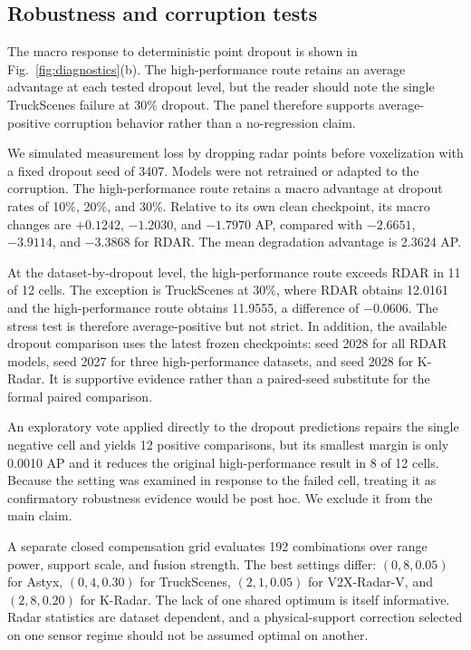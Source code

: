 \documentclass[preprint,12pt,times]{elsarticle}
\newcommand{\figref}[1]{\textcolor{floatreviewblue}{Fig.~\ref{#1}}}
\newcommand{\figref}[1]{Fig.~\ref{#1}}
\begin{document}
\subsection{Robustness and corruption tests}

The macro response to deterministic point dropout is shown in
\figref{fig:diagnostics}(b). The high-performance route retains an average
advantage at each tested dropout level, but the reader should note the single
TruckScenes failure at 30\% dropout. The panel therefore supports
average-positive corruption behavior rather than a no-regression claim.

We simulated measurement loss by dropping radar points before voxelization
with a fixed dropout seed of 3407. Models were not retrained or adapted to the
corruption. The high-performance route retains a macro advantage at dropout
rates of 10\%, 20\%, and 30\%. Relative
to its own clean checkpoint, its macro changes are $+0.1242$, $-1.2030$, and
$-1.7970$ AP, compared with $-2.6651$, $-3.9114$, and $-3.3868$ for RDAR.
The mean degradation advantage is 2.3624 AP.

At the dataset-by-dropout level, the high-performance route exceeds RDAR in 11
of 12 cells. The exception is TruckScenes at 30\%, where RDAR obtains 12.0161
and the high-performance route obtains 11.9555, a difference of $-0.0606$.
The stress test is therefore average-positive but not strict. In addition, the
available dropout comparison uses the latest frozen checkpoints: seed 2028 for
all RDAR models, seed 2027 for three high-performance datasets, and seed 2028
for K-Radar. It is supportive evidence rather than a paired-seed substitute
for the formal paired comparison.

An exploratory vote applied directly to the dropout predictions repairs the
single negative cell and yields 12 positive comparisons, but its smallest
margin is only 0.0010 AP and it reduces the original high-performance result
in 8 of 12 cells. Because the setting was examined in response to the failed
cell, treating it as confirmatory robustness evidence would be post hoc. We
exclude it from the main claim.

A separate closed compensation grid evaluates 192 combinations over range
power, support scale, and fusion strength. The best settings differ:
$(0,8,0.05)$ for Astyx, $(0,4,0.30)$ for TruckScenes,
$(2,1,0.05)$ for V2X-Radar-V, and $(2,8,0.20)$ for K-Radar. The lack of one
shared optimum is itself informative. Radar statistics are dataset dependent,
and a physical-support correction selected on one sensor regime should not be
assumed optimal on another.
\end{document}
